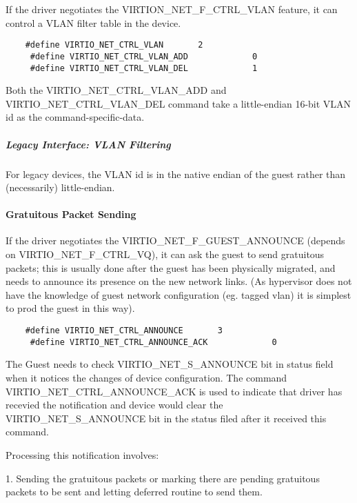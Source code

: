 If the driver negotiates the VIRTION_NET_F_CTRL_VLAN feature, it
can control a VLAN filter table in the device.

\begin{lstlisting}
	#define VIRTIO_NET_CTRL_VLAN       2
	 #define VIRTIO_NET_CTRL_VLAN_ADD             0
	 #define VIRTIO_NET_CTRL_VLAN_DEL             1
\end{lstlisting}

Both the VIRTIO_NET_CTRL_VLAN_ADD and VIRTIO_NET_CTRL_VLAN_DEL
command take a little-endian 16-bit VLAN id as the command-specific-data.

\subparagraph{Legacy Interface: VLAN Filtering}\label{sec:Device Types / Network Device / Device Operation / Control Virtqueue / VLAN Filtering / Legacy Interface: VLAN Filtering}
For legacy devices, the VLAN id is in the
native endian of the guest rather than (necessarily) little-endian.

\paragraph{Gratuitous Packet Sending}\label{sec:Device Types / Network Device / Device Operation / Control Virtqueue / Gratuitous Packet Sending}

If the driver negotiates the VIRTIO_NET_F_GUEST_ANNOUNCE (depends
on VIRTIO_NET_F_CTRL_VQ), it can ask the guest to send gratuitous
packets; this is usually done after the guest has been physically
migrated, and needs to announce its presence on the new network
links. (As hypervisor does not have the knowledge of guest
network configuration (eg. tagged vlan) it is simplest to prod
the guest in this way).

\begin{lstlisting}
	#define VIRTIO_NET_CTRL_ANNOUNCE       3
	 #define VIRTIO_NET_CTRL_ANNOUNCE_ACK             0
\end{lstlisting}

The Guest needs to check VIRTIO_NET_S_ANNOUNCE bit in status
field when it notices the changes of device configuration. The
command VIRTIO_NET_CTRL_ANNOUNCE_ACK is used to indicate that
driver has recevied the notification and device would clear the
VIRTIO_NET_S_ANNOUNCE bit in the status filed after it received
this command.

Processing this notification involves:

1. Sending the gratuitous packets or marking there are pending
  gratuitous packets to be sent and letting deferred routine to
  send them.


